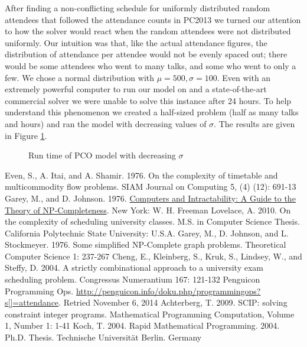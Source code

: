 \documentclass[]{article}
\theoremstyle{definition}
\theoremstyle{remark}
\numberwithin{equation}{section}
\begin{document}
After finding a non-conflicting schedule for uniformly distributed random attendees that followed the attendance counts in PC2013 we turned our attention to how the solver would react when the random attendees were not distributed uniformly. Our intuition was that, like the actual attendance figures, the distribution of attendance per attendee would not be evenly spaced out; there would be some attendees who went to many talks, and some who went to only a few. We chose a normal distribution with $\mu = 500, \sigma = 100$. Even with an extremely powerful computer to run our model on and a state-of-the-art commercial solver we were unable to solve this instance after 24 hours. To help understand this phenomenon we created a half-sized problem (half as many talks and hours) and ran the model with decreasing values of $\sigma$. The results are given in Figure \ref{2013_normal_sigma_run_time}.
\begin{figure}[h!]
\caption{Run time of PCO model with decreasing $\sigma$}
	\centering
		
	\label{2013_normal_sigma_run_time}
\end{figure}

\pagebreak

\begin{thebibliography}{9}
  Even, S., A. Itai, and A. Shamir. 1976. On the complexity of timetable and multicommodity flow problems. SIAM Journal on Computing 5, (4) (12): 691-13
  Garey, M., and D. Johnson. 1976. \underline{Computers and Intractability: A Guide to the Theory of NP-Completeness}. New York: W. H. Freeman
  Lovelace, A. 2010. On the complexity of scheduling university classes. M.S. in Computer Science Thesis. California Polytechnic State University: U.S.A.	
  Garey, M., D. Johnson, and L. Stockmeyer. 1976. Some simplified NP-Complete graph problems. Theoretical Computer Science 1: 237-267
  Cheng, E., Kleinberg, S., Kruk, S., Lindsey, W., and Steffy, D. 2004. A strictly combinational approach to a university exam scheduling problem. Congressus Numerantium 167: 121-132
  Penguicon Programming Ops. \underline{http://penguicon.info/doku.php/programmingops?s[]=attendance}. Retried November 6, 2014
  Achterberg, T. 2009. SCIP: solving constraint integer programs. Mathematical Programming Computation, Volume 1, Number 1: 1-41
  Koch, T. 2004. Rapid Mathematical Programming. 2004. Ph.D. Thesis. Technische Universit{\"a}t Berlin. Germany
\end{thebibliography}
\end{document}
